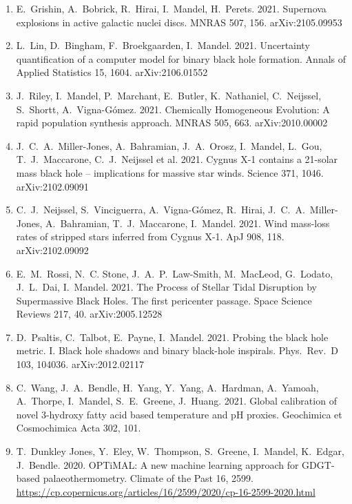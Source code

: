 \documentclass[margin,line]{res}
\begin{document}
\begin{resume}
\begin{enumerate}
\item E.~Grishin, A.~Bobrick, R.~Hirai, I.~Mandel, H.~Perets. 2021.  Supernova explosions in active galactic nuclei discs.  MNRAS 507, 156.  arXiv:2105.09953

\item L.~Lin, D.~Bingham, F.~Broekgaarden, I.~Mandel. 2021. Uncertainty quantification of a computer model for binary black hole formation. Annals of Applied Statistics 15, 1604.  arXiv:2106.01552 

\item J.~Riley, I.~Mandel, P.~Marchant, E.~Butler, K.~Nathaniel, C.~Neijssel, S.~Shortt, A.~Vigna-G\'{o}mez.  2021. Chemically Homogeneous Evolution: A rapid population synthesis approach. MNRAS 505, 663.  arXiv:2010.00002

\item J.~C.~A.~Miller-Jones, A.~Bahramian, J.~A.~Orosz, I.~Mandel, L.~Gou, T.~J.~Maccarone, C.~J.~Neijssel et al.  2021.  Cygnus X-1 contains a 21-solar mass black hole -- implications for massive star winds.  Science 371, 1046. arXiv:2102.09091

\item C.~J.~Neijssel, S.~Vinciguerra, A.~Vigna-G\'{o}mez, R.~Hirai, J.~C.~A.~Miller-Jones, A.~Bahramian, T.~J.~Maccarone, I.~Mandel.  2021.  Wind mass-loss rates of stripped stars inferred from Cygnus X-1. ApJ 908, 118.  arXiv:2102.09092

\item E.~M.~Rossi, N.~C. Stone, J.~A.~P.~Law-Smith, M.~MacLeod, G.~Lodato, J.~L.~Dai, I.~Mandel.  2021.  The Process of Stellar Tidal Disruption by Supermassive Black Holes. The first pericenter passage.  Space Science Reviews 217, 40.  arXiv:2005.12528

\item D.~Psaltis, C.~Talbot, E.~Payne, I.~Mandel.  2021. Probing the black hole metric. I. Black hole shadows and binary black-hole inspirals.  Phys.~Rev.~D 103, 104036. arXiv:2012.02117

\item C.~Wang, J.~A.~Bendle,  H.~Yang, Y.~Yang, A.~Hardman, A.~Yamoah, A.~Thorpe, I.~Mandel, S.~E.~Greene, J.~Huang.  2021. Global calibration of novel 3-hydroxy fatty acid based temperature and pH proxies.  Geochimica et Cosmochimica Acta 302, 101. 

\item T.~Dunkley Jones, Y.~Eley, W.~Thompson, S.~Greene, I.~Mandel, K.~Edgar, J.~Bendle.  2020.  OPTiMAL: A new machine learning approach for GDGT-based palaeothermometry.  Climate of the Past 16, 2599.  \url{https://cp.copernicus.org/articles/16/2599/2020/cp-16-2599-2020.html}


\end{enumerate}
\end{resume}
\end{document}
